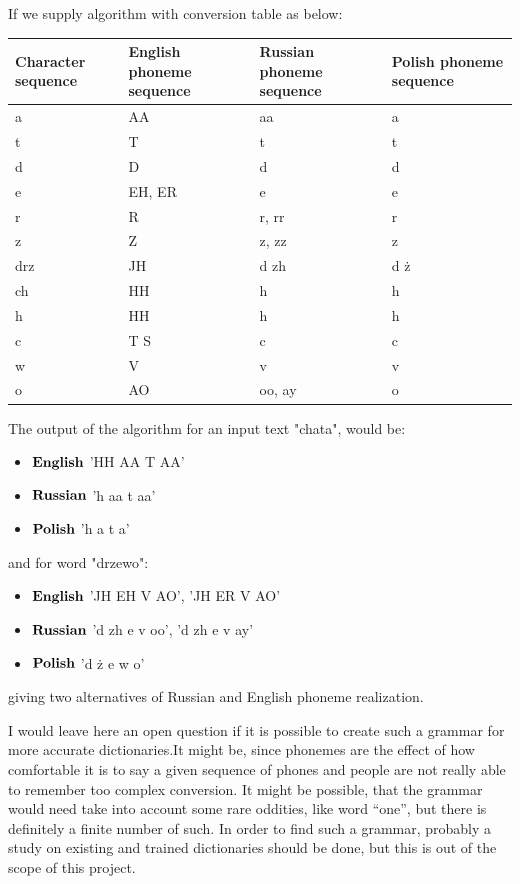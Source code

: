 \documentclass[12pt,a4paper,english]{article}
\begin{document}
\newpage

If we supply algorithm with conversion table as below:
\begin{center}
\begin{tabular}{| p{3.5cm} | p{3.5cm} | p{3.5cm} | p{3.3cm} |}
\hline
\rowcolor[gray]{0.8}
Character sequence & English phoneme sequence & Russian phoneme sequence & Polish phoneme sequence
\\ \hline
a & AA & aa & a
\\ \hline
t & T & t & t
\\ \hline
d & D & d & d
\\ \hline
e & EH, ER & e & e
\\ \hline
r & R & r, rr & r
\\ \hline
z & Z & z, zz & z
\\ \hline
drz & JH & d zh & d ż
\\ \hline
ch & HH & h & h
\\ \hline
h & HH & h & h
\\ \hline
c & T S & c & c
\\ \hline
w & V & v & v
\\ \hline
o & AO & oo, ay & o
\\ \hline
\end{tabular}
\end{center}

The output of the algorithm for an input text "chata", would be:
\begin{itemize}
    \item $\bold{English}$ 'HH AA T AA'
    \item $\bold{Russian}$ 'h aa t aa'
    \item $\bold{Polish}$ 'h a t a'
\end{itemize}
and for word "drzewo":
\begin{itemize}
    \item $\bold{English}$ 'JH EH V AO', 'JH ER V AO'
    \item $\bold{Russian}$ 'd zh e v oo', 'd zh e v ay'
    \item $\bold{Polish}$ 'd ż e w o'
\end{itemize}
giving two alternatives of Russian and English phoneme realization. \newline

I would leave here an open question if it is possible to create such a grammar for more accurate dictionaries.It might be, since phonemes are the effect of how comfortable it is to say a given sequence of phones and people are not really able to remember too complex conversion. It might be possible, that the grammar would need take into account some rare oddities, like word “one”, but there is definitely a finite number of such. In order to find such a grammar, probably a study on existing and trained dictionaries should be done, but this is out of the scope of this project.
\end{document}
